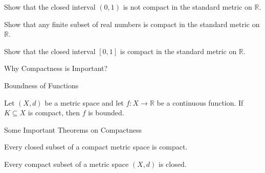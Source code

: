 \documentclass[12pt, a4paper]{article}
\begin{document}
\clearpage

\begin{problem}
    Show that the closed interval $(0, 1)$ is not compact in the standard metric on $\mathbb{R}$.
\end{problem}

\clearpage

\begin{problem}
    Show that any finite subset of real numbers is compact in the standard metric on $\mathbb{R}$.
\end{problem}

\clearpage

\begin{problem}
    Show that the closed interval $[0, 1]$ is compact in the standard metric on $\mathbb{R}$.
\end{problem}

\clearpage

\begin{heading}
    Why Compactness is Important?
\end{heading}

\clearpage

\begin{heading}
    Boundness of Functions
\end{heading}

\vspace{10pt}

\begin{theorem}
    Let $(X, d)$ be a metric space and let $f : X \to \mathbb{R}$ be a continuous function. If $K \subseteq X$ is compact, then $f$ is bounded.
\end{theorem}

\clearpage

\begin{heading}
    Some Important Theorems on Compactness
\end{heading}

\vspace{10pt}

\begin{theorem}
    Every closed subset of a compact metric space is compact.
\end{theorem}

\clearpage

\begin{theorem}
    Every compact subset of a metric space $(X, d)$ is closed.
\end{theorem}
\end{document}
